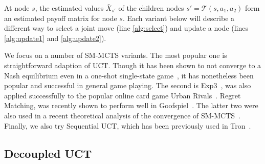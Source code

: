 \documentclass[conference]{IEEEtran}
\newcommand{\cA}{\mathcal{A}}
\newcommand{\cT}{\mathcal{T}}
\begin{document}
At node $s$, the estimated values $\bar{X}_{s'}$ of the children nodes $s' = \cT(s,a_1,a_2)$ 
form an estimated payoff matrix for node $s$. 
Each variant below will describe a different way to select a joint 
move (line \ref{alg:select}) and update a node (lines \ref{alg:update1} and \ref{alg:update2}). 


We focus on a number of SM-MCTS variants. The most popular one is straightforward adaption of UCT. 
Though it has been shown to not converge to a Nash equilibrium even in a one-shot single-state 
game~\cite{Shafiei09}, it has nonetheless been popular and successful in general game playing. 
The second is Exp3~\cite{Exp3}, was also applied successfully to the popular online card game 
Urban Rivals~\cite{Teytaud11Upper,StPierre12Online}. 
Regret Matching, was recently shown to perform well in Goofspiel~\cite{Lanctot13Goofspiel}.
The latter two were also used in a recent theoretical analysis of the convergence of SM-MCTS~\cite{Lisy13Computing}.
Finally, we also try Sequential UCT, which has been previously used in Tron~\cite{Samothrakis10Tron,Lanctot13Tron}.

\subsection{Decoupled UCT} 
\end{document}
